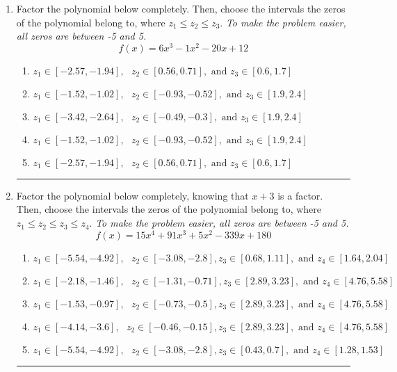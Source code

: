 \documentclass[14pt]{extbook}
\newcommand{\litem}[1]{\item#1\hspace*{-1cm}\rule{\textwidth}{0.4pt}}
\begin{document}
\begin{enumerate}
{\begin{enumerate}[label=\Alph*.]
\end{enumerate} }
\litem{
Factor the polynomial below completely. Then, choose the intervals the zeros of the polynomial belong to, where $z_1 \leq z_2 \leq z_3$. \textit{To make the problem easier, all zeros are between -5 and 5.}\[ f(x) = 6x^{3} -1 x^{2} -20 x + 12 \]\begin{enumerate}[label=\Alph*.]
\item \( z_1 \in [-2.57, -1.94], \text{   }  z_2 \in [0.56, 0.71], \text{   and   } z_3 \in [0.6, 1.7] \)
\item \( z_1 \in [-1.52, -1.02], \text{   }  z_2 \in [-0.93, -0.52], \text{   and   } z_3 \in [1.9, 2.4] \)
\item \( z_1 \in [-3.42, -2.64], \text{   }  z_2 \in [-0.49, -0.3], \text{   and   } z_3 \in [1.9, 2.4] \)
\item \( z_1 \in [-1.52, -1.02], \text{   }  z_2 \in [-0.93, -0.52], \text{   and   } z_3 \in [1.9, 2.4] \)
\item \( z_1 \in [-2.57, -1.94], \text{   }  z_2 \in [0.56, 0.71], \text{   and   } z_3 \in [0.6, 1.7] \)

\end{enumerate} }
\litem{
Factor the polynomial below completely, knowing that $x+3$ is a factor. Then, choose the intervals the zeros of the polynomial belong to, where $z_1 \leq z_2 \leq z_3 \leq z_4$. \textit{To make the problem easier, all zeros are between -5 and 5.}\[ f(x) = 15x^{4} +91 x^{3} +5 x^{2} -339 x + 180 \]\begin{enumerate}[label=\Alph*.]
\item \( z_1 \in [-5.54, -4.92], \text{   }  z_2 \in [-3.08, -2.8], z_3 \in [0.68, 1.11], \text{   and   } z_4 \in [1.64, 2.04] \)
\item \( z_1 \in [-2.18, -1.46], \text{   }  z_2 \in [-1.31, -0.71], z_3 \in [2.89, 3.23], \text{   and   } z_4 \in [4.76, 5.58] \)
\item \( z_1 \in [-1.53, -0.97], \text{   }  z_2 \in [-0.73, -0.5], z_3 \in [2.89, 3.23], \text{   and   } z_4 \in [4.76, 5.58] \)
\item \( z_1 \in [-4.14, -3.6], \text{   }  z_2 \in [-0.46, -0.15], z_3 \in [2.89, 3.23], \text{   and   } z_4 \in [4.76, 5.58] \)
\item \( z_1 \in [-5.54, -4.92], \text{   }  z_2 \in [-3.08, -2.8], z_3 \in [0.43, 0.7], \text{   and   } z_4 \in [1.28, 1.53] \)


\end{enumerate}}
\end{enumerate}
\end{document}
